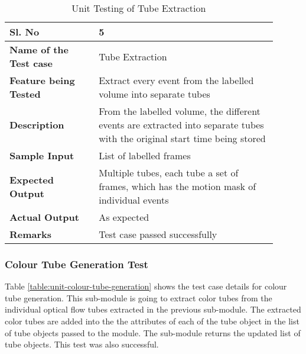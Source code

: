         \FloatBarrier
        \begin{table}[H]
            \caption{Unit Testing of Tube Extraction}
            \begin{tabular}{|p{0.3\linewidth}|p{0.6\linewidth}|}
                \hline
                \textbf{Sl. No }              &\textbf{ 5}\\
                \hline
                \textbf{Name of the Test case}& Tube Extraction \\
                \hline
                \textbf{Feature being Tested}  & Extract every event from the
                labelled volume into separate tubes \\
                \hline
                \textbf{Description}           & From the labelled volume, the
                different events are extracted into separate tubes with the
                original start time being stored \\
                \hline
                \textbf{Sample Input}          & List of labelled frames \\
                \hline
                \textbf{Expected Output}       & Multiple tubes, each tube a
                set of frames, which has the motion mask of individual events \\
                \hline
                \textbf{Actual Output}         & As expected \\
                \hline
                \textbf{Remarks }              & Test case passed successfully \\
                \hline
            \end{tabular}
            \label{table:unit-tube-extraction}
        \end{table}


        \subsubsection{Colour Tube Generation Test}

        Table \ref{table:unit-colour-tube-generation} shows the test case
        details for colour tube generation. This sub-module is going to extract
        color tubes from the individual optical flow tubes extracted in the
        previous sub-module. The extracted color tubes are added into the the
        attributes of each of the tube object in the list of tube objects
        passed to the module. The sub-module returns the updated list of tube
        objects. This test was also successful.

